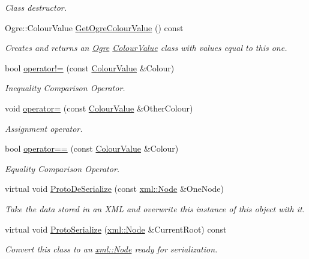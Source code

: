 \begin{DoxyCompactItemize}
\begin{DoxyCompactList}\small\item\em Class destructor. \item\end{DoxyCompactList}\item 
Ogre::ColourValue \hyperlink{classMezzanine_1_1ColourValue_a7e0b3548fc11cdcbd89fab3ad53faaf1}{GetOgreColourValue} () const 
\begin{DoxyCompactList}\small\item\em Creates and returns an \hyperlink{namespaceOgre}{Ogre} \hyperlink{classMezzanine_1_1ColourValue}{ColourValue} class with values equal to this one. \item\end{DoxyCompactList}\item 
bool \hyperlink{classMezzanine_1_1ColourValue_abeebcf4e38cd1a81f45a7cee35e580f2}{operator!=} (const \hyperlink{classMezzanine_1_1ColourValue}{ColourValue} \&Colour)
\begin{DoxyCompactList}\small\item\em Inequality Comparison Operator. \item\end{DoxyCompactList}\item 
void \hyperlink{classMezzanine_1_1ColourValue_a70b630832bc4db2c47a45c1ca8b06581}{operator=} (const \hyperlink{classMezzanine_1_1ColourValue}{ColourValue} \&OtherColour)
\begin{DoxyCompactList}\small\item\em Assignment operator. \item\end{DoxyCompactList}\item 
bool \hyperlink{classMezzanine_1_1ColourValue_a02b963ef5c928b35b3347f94bb074e12}{operator==} (const \hyperlink{classMezzanine_1_1ColourValue}{ColourValue} \&Colour)
\begin{DoxyCompactList}\small\item\em Equality Comparison Operator. \item\end{DoxyCompactList}\item 
virtual void \hyperlink{classMezzanine_1_1ColourValue_aa77872e676423494a2bfef2d6e1d90ac}{ProtoDeSerialize} (const \hyperlink{classMezzanine_1_1xml_1_1Node}{xml::Node} \&OneNode)
\begin{DoxyCompactList}\small\item\em Take the data stored in an XML and overwrite this instance of this object with it. \item\end{DoxyCompactList}\item 
virtual void \hyperlink{classMezzanine_1_1ColourValue_a7a118e5794bf1e90e71ba9166ed51db3}{ProtoSerialize} (\hyperlink{classMezzanine_1_1xml_1_1Node}{xml::Node} \&CurrentRoot) const 
\begin{DoxyCompactList}\small\item\em Convert this class to an \hyperlink{classMezzanine_1_1xml_1_1Node}{xml::Node} ready for serialization. \item\end{DoxyCompactList}\end{DoxyCompactItemize}
